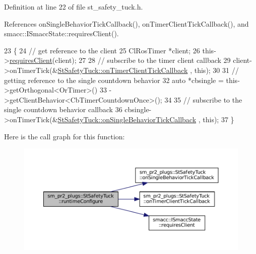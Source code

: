 Definition at line 22 of file st\+\_\+safety\+\_\+tuck.\+h.



References on\+Single\+Behavior\+Tick\+Callback(), on\+Timer\+Client\+Tick\+Callback(), and smacc\+::\+I\+Smacc\+State\+::requires\+Client().


\begin{DoxyCode}
23     \{
24         \textcolor{comment}{// get reference to the client}
25         ClRosTimer *client;
26         this->\hyperlink{classsmacc_1_1ISmaccState_a7f95c9f0a6ea2d6f18d1aec0519de4ac}{requiresClient}(client);
27 
28         \textcolor{comment}{// subscribe to the timer client callback}
29         client->onTimerTick(&\hyperlink{structsm__pr2__plugs_1_1StSafetyTuck_aa1082813087c8201894aa1047ecf8a9b}{StSafetyTuck::onTimerClientTickCallback}
      , \textcolor{keyword}{this});
30 
31         \textcolor{comment}{// getting reference to the single countdown behavior}
32         \textcolor{keyword}{auto} *cbsingle = this->getOrthogonal<OrTimer>()
33                              ->getClientBehavior<CbTimerCountdownOnce>();
34 
35         \textcolor{comment}{// subscribe to the single countdown behavior callback}
36         cbsingle->onTimerTick(&\hyperlink{structsm__pr2__plugs_1_1StSafetyTuck_ac3d9dc48854336a560515bb30c7d9dd9}{StSafetyTuck::onSingleBehaviorTickCallback}
      , \textcolor{keyword}{this});
37     \}
\end{DoxyCode}
Here is the call graph for this function\+:
\nopagebreak
\begin{figure}[H]
\begin{center}
\leavevmode
\includegraphics[width=350pt]{structsm__pr2__plugs_1_1StSafetyTuck_ae58dc354ff826ff1a124376272f75cc9_cgraph}
\end{center}
\end{figure}
\mbox{\label{structsm__pr2__plugs_1_1StSafetyTuck_a0682a377d9ef4f79963011de6e3acc9d}} 

